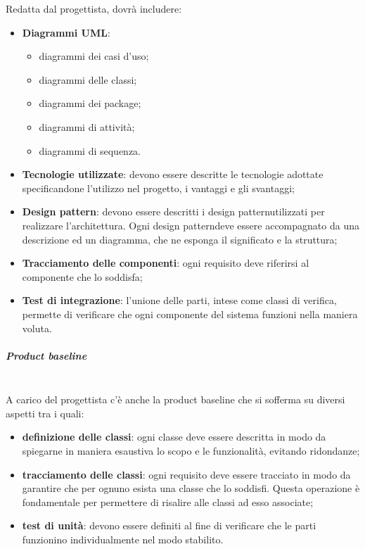 Redatta dal progettista, dovrà includere:
	\begin{itemize}
		\item \textbf{Diagrammi UML\glo}:
		\begin{itemize}
			\item diagrammi dei casi d'uso;
			\item diagrammi delle classi;
			\item diagrammi dei package;
			\item diagrammi di attività;
			\item diagrammi di sequenza.
		\end{itemize}
		\item \textbf{Tecnologie utilizzate}: devono essere descritte le tecnologie 
			adottate specificandone l'utilizzo nel progetto, i vantaggi e gli svantaggi;
		\item \textbf{Design pattern\glo}: devono essere descritti i design 
			pattern\glosp utilizzati per realizzare l'architettura. Ogni design 
			pattern\glosp deve essere accompagnato da una descrizione ed un diagramma, che 
			ne esponga il significato e la struttura;
		\item \textbf{Tracciamento delle componenti}: ogni requisito deve riferirsi 
			al componente che lo soddisfa;
		\item \textbf{Test di integrazione}: l'unione delle parti, intese come 
			classi di verifica, permette di verificare che ogni componente del sistema 
			funzioni nella maniera voluta. \newline
	\end{itemize}
			
\subparagraph{Product baseline} \mbox{}\\

A carico del progettista c'è anche la product baseline che si sofferma su 
diversi aspetti tra i quali:
	\begin{itemize}
		\item \textbf{definizione delle classi}: ogni classe deve essere descritta 
			in modo da spiegarne in maniera esaustiva lo scopo e le funzionalità, evitando 
			ridondanze;
		\item \textbf{tracciamento delle classi}: ogni requisito deve essere 
			tracciato in modo da garantire che per ognuno esista una classe che lo soddisfi. 
			Questa operazione è fondamentale per permettere di risalire alle classi ad esso 
			associate;
		\item \textbf{test di unità}: devono essere definiti al fine di verificare 
			che le parti funzionino individualmente nel modo stabilito.
	\end{itemize}
		
